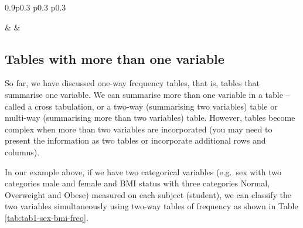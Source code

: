 \documentclass[
]{memoir}
\begin{document}
\begin{table}[ht]
\begin{centerbox}
\begin{threeparttable}
\begin{tabularx}{0.9\textwidth}{p{} p{} p{}}
\hhline{}

 &
 &
 \tabularnewline[-0.5pt]


\end{tabularx}
\end{threeparttable}\par\end{centerbox}

\end{table}
 

\hypertarget{tables-with-more-than-one-variable}{%
\subsection{Tables with more than one variable}\label{tables-with-more-than-one-variable}}

So far, we have discussed one-way frequency tables, that is, tables that summarise one variable. We can summarise more than one variable in a table -- called a cross tabulation, or a two-way (summarising two variables) table or multi-way (summarising more than two variables) table. However, tables become complex when more than two variables are incorporated (you may need to present the information as two tables or incorporate additional rows and columns).

In our example above, if we have two categorical variables (e.g.~sex with two categories male and female and BMI status with three categories Normal, Overweight and Obese) measured on each subject (student), we can classify the two variables simultaneously using two-way tables of frequency as shown in Table \ref{tab:tab1-sex-bmi-freq}.

 
  \providecommand{\huxb}[2]{\arrayrulecolor[RGB]{#1}\global\arrayrulewidth=#2pt}
  \providecommand{\huxvb}[2]{\color[RGB]{#1}\vrule width #2pt}
  \providecommand{\huxtpad}[1]{\rule{0pt}{#1}}
  \providecommand{\huxbpad}[1]{\rule[-#1]{0pt}{#1}}
\end{document}
